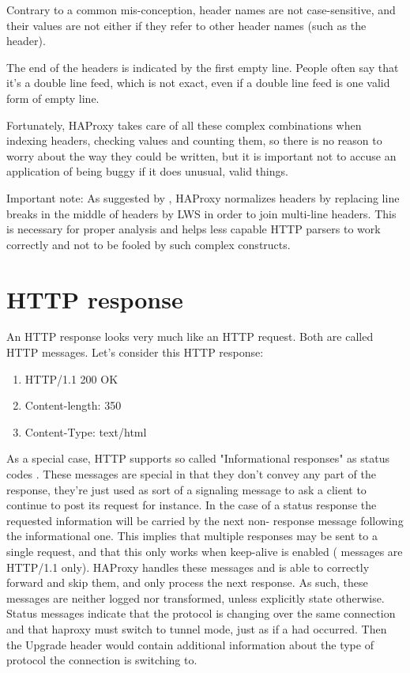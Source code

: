 Contrary to a common mis-conception, header names are not case-sensitive, and
their values are not either if they refer to other header names (such as the
 header).

The end of the headers is indicated by the first empty line. People often say
that it's a double line feed, which is not exact, even if a double line feed
is one valid form of empty line.

Fortunately, HAProxy takes care of all these complex combinations when indexing
headers, checking values and counting them, so there is no reason to worry
about the way they could be written, but it is important not to accuse an
application of being buggy if it does unusual, valid things.

\begin{note}{Important note:}
   As suggested by , HAProxy normalizes headers by replacing line breaks
   in the middle of headers by LWS in order to join multi-line headers. This
   is necessary for proper analysis and helps less capable HTTP parsers to work
   correctly and not to be fooled by such complex constructs.
\end{note}

\section{HTTP response}
\label{sec:http_response}

An HTTP response looks very much like an HTTP request. Both are called HTTP
messages. Let's consider this HTTP response:

\begin{enumerate}
\item HTTP/1.1 200 OK
\item Content-length: 350
\item Content-Type: text/html
\end{enumerate}

As a special case, HTTP supports so called "Informational responses" as status
codes . These messages are special in that they don't convey any part of the
response, they're just used as sort of a signaling message to ask a client to
continue to post its request for instance. In the case of a status  response
the requested information will be carried by the next non- response message
following the informational one. This implies that multiple responses may be
sent to a single request, and that this only works when keep-alive is enabled
( messages are HTTP/1.1 only). HAProxy handles these messages and is able to
correctly forward and skip them, and only process the next  response. As
such, these messages are neither logged nor transformed, unless explicitly
state otherwise. Status  messages indicate that the protocol is changing
over the same connection and that haproxy must switch to tunnel mode, just as
if a  had occurred. Then the Upgrade header would contain additional
information about the type of protocol the connection is switching to.

